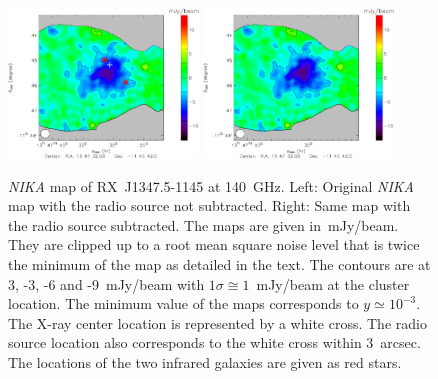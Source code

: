 	\begin{figure}
	\centering
	\includegraphics[width=0.45\textwidth]{Figure/RXJ1347-1145_map_2mm}
	\hspace*{0.5cm}
	\includegraphics[width=0.45\textwidth]{Figure/RXJ1347-1145_map_2mm_pointsource_sub}
	\caption{{\it NIKA} map of \mbox{RX~J1347.5-1145} at 140~GHz. Left: Original {\it NIKA} map with the radio source not subtracted. Right: Same map with the radio source subtracted. The maps are given in~mJy/beam. They are clipped up to a root mean square noise level that is twice the minimum of the map as detailed in the text. The contours are at 3, -3, -6 and -9~mJy/beam with $1 \sigma \cong 1$~mJy/beam at the cluster location. The minimum value of the maps corresponds to $y \simeq 10^{-3}$. The \mbox{X-ray} center location is represented by a white cross. The radio source location also corresponds to the white cross within 3~arcsec. The locations of the two infrared galaxies are given as red stars.}
        \label{fig:rxj}
	\end{figure}
	

